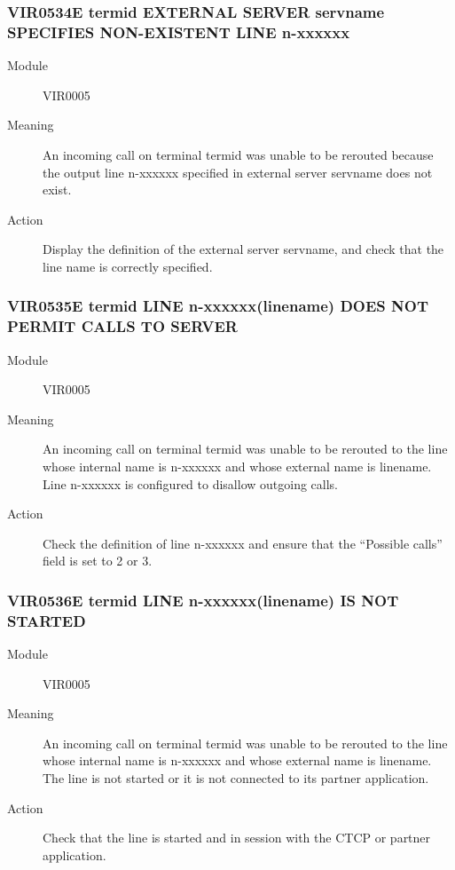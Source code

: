 \documentclass[letterpaper,10pt,english]{sphinxmanual}
\begin{document}
\subsubsection{VIR0534E termid EXTERNAL SERVER servname SPECIFIES NON-EXISTENT LINE n-xxxxxx}
\label{\detokenize{messages:vir0534e-termid-external-server-servname-specifies-non-existent-line-n-xxxxxx}}\begin{description}
\item[{Module}] \leavevmode
VIR0005

\item[{Meaning}] \leavevmode
An incoming call on terminal termid was unable to be rerouted because the output line n-xxxxxx specified in external server servname does not exist.

\item[{Action}] \leavevmode
Display the definition of the external server servname, and check that the line name is correctly specified.

\end{description}


\subsubsection{VIR0535E termid LINE n-xxxxxx(linename) DOES NOT PERMIT CALLS TO SERVER}
\label{\detokenize{messages:vir0535e-termid-line-n-xxxxxx-linename-does-not-permit-calls-to-server}}\begin{description}
\item[{Module}] \leavevmode
VIR0005

\item[{Meaning}] \leavevmode
An incoming call on terminal termid was unable to be rerouted to the line whose internal name is n-xxxxxx and whose external name is linename. Line n-xxxxxx is configured to disallow outgoing calls.

\item[{Action}] \leavevmode
Check the definition of line n-xxxxxx and ensure that the “Possible calls” field is set to 2 or 3.

\end{description}


\subsubsection{VIR0536E termid LINE n-xxxxxx(linename) IS NOT STARTED}
\label{\detokenize{messages:vir0536e-termid-line-n-xxxxxx-linename-is-not-started}}\begin{description}
\item[{Module}] \leavevmode
VIR0005

\item[{Meaning}] \leavevmode
An incoming call on terminal termid was unable to be rerouted to the line whose internal name is n-xxxxxx and whose external name is linename. The line is not started or it is not connected to its partner application.

\item[{Action}] \leavevmode
Check that the line is started and in session with the CTCP or partner application.

\end{description}
\end{document}
